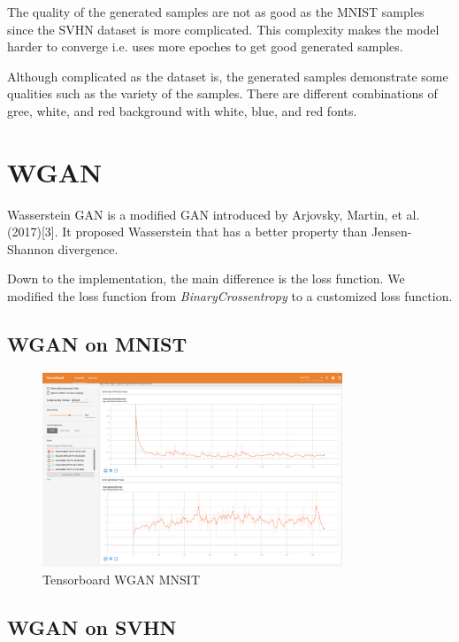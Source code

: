 \documentclass{article}
\begin{document}
The quality of the generated samples are not as good as the MNIST samples since the SVHN dataset is more complicated.
This complexity makes the model harder to converge i.e. uses more epoches to get good generated samples.

Although complicated as the dataset is, the generated samples demonstrate some qualities such as the variety of the samples. There are different combinations of gree, white, and red background with white, blue, and red fonts.

\section{WGAN}

Wasserstein GAN is a modified GAN introduced by Arjovsky, Martin, et al.(2017)[3]. 
It proposed Wasserstein that has a better property than Jensen-Shannon divergence.

Down to the implementation, the main difference is the loss function. We modified the loss function from \textit{BinaryCrossentropy} to a customized loss function.


\subsection{WGAN on MNIST}

\begin{figure}[!htb]
  \centering
  \includegraphics[width=0.8\textwidth]{tensorboard-WGAN-MNIST.png}
  \caption{Tensorboard WGAN MNSIT}
  \label{fig:TB_GAN_MNSIT}
\end{figure}

\subsection{WGAN on SVHN}
\end{document}
